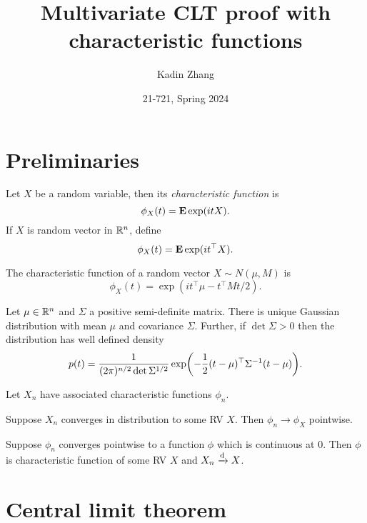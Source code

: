 \documentclass{article}
\title{Multivariate CLT proof with characteristic functions}
\author{Kadin Zhang}
\date{21-721, Spring 2024}
\begin{document}
\maketitle
{
\small
\setlength{\parindent}{0em}
\setlength{\parskip}{1em}
}

\section{Preliminaries}
\begin{defi}
    Let $X$ be a random variable, then its \emph{characteristic function} is 
    \[
        \phi _X (t) = \mathbf{E} \exp (itX). 
    \]
    If $X$ is random vector in $\mathbb{R}^n $, define
    \[
        \phi _X (t) = \mathbf{E} \exp (it^{\top} X). 
    \]
\end{defi}
\begin{prop}
    The characteristic function of a random vector $X \sim N(\mu , M)$ is 
    \[
        \phi _X (t) = \exp (it^{\top} \mu - t^{\top} M t/2). 
    \]
\end{prop}

\begin{prop}[Uniqueness]
    Let $\mu \in \mathbb{R}^n $ and $\Sigma $ a positive semi-definite matrix. There is unique Gaussian distribution with mean $\mu $ and covariance $\Sigma $. Further, if $\det \Sigma >0$ then the distribution has well defined density 
    \[
        p(t) = \frac{1}{(2\pi )^{n/2} \det \Sigma ^{1/2} }\exp \parens*{-\frac{1}{2}(t-\mu )^{\top} \Sigma^{-1} (t-\mu ) } . 
    \]
\end{prop}

\begin{thm}
    Let $X_n $ have associated characteristic functions $\phi _n $. 
    \begin{enum}
        \item Suppose $X_n $ converges in distribution to some RV $X$. Then $\phi _n \to \phi_X$ pointwise. 
        \item Suppose $\phi _n $ converges pointwise to a function $\phi$ which is continuous at $0$. Then $\phi $ is characteristic function of some RV $X$ and $X_n \xrightarrow{\text{d}} X$. 
    \end{enum}
\end{thm}

\section{Central limit theorem}
\end{document}
